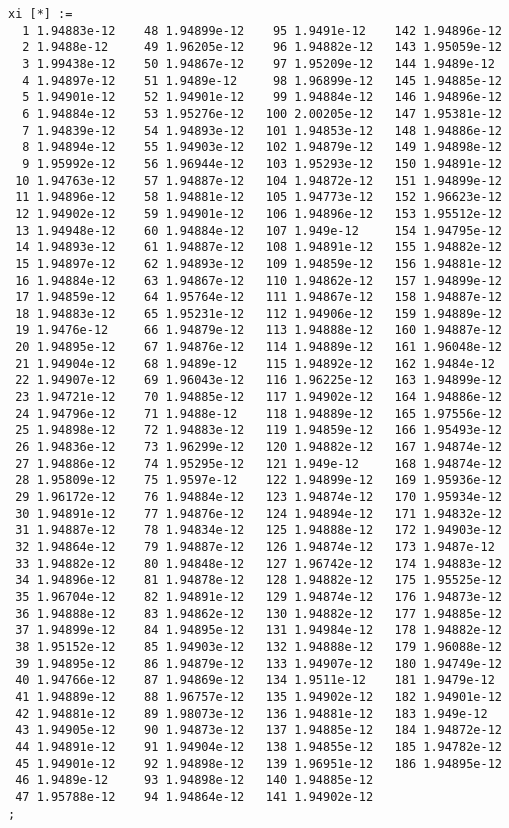 \documentclass{article}
\begin{document}
\begin{verbatim}
xi [*] :=
  1 1.94883e-12    48 1.94899e-12    95 1.9491e-12    142 1.94896e-12
  2 1.9488e-12     49 1.96205e-12    96 1.94882e-12   143 1.95059e-12
  3 1.99438e-12    50 1.94867e-12    97 1.95209e-12   144 1.9489e-12
  4 1.94897e-12    51 1.9489e-12     98 1.96899e-12   145 1.94885e-12
  5 1.94901e-12    52 1.94901e-12    99 1.94884e-12   146 1.94896e-12
  6 1.94884e-12    53 1.95276e-12   100 2.00205e-12   147 1.95381e-12
  7 1.94839e-12    54 1.94893e-12   101 1.94853e-12   148 1.94886e-12
  8 1.94894e-12    55 1.94903e-12   102 1.94879e-12   149 1.94898e-12
  9 1.95992e-12    56 1.96944e-12   103 1.95293e-12   150 1.94891e-12
 10 1.94763e-12    57 1.94887e-12   104 1.94872e-12   151 1.94899e-12
 11 1.94896e-12    58 1.94881e-12   105 1.94773e-12   152 1.96623e-12
 12 1.94902e-12    59 1.94901e-12   106 1.94896e-12   153 1.95512e-12
 13 1.94948e-12    60 1.94884e-12   107 1.949e-12     154 1.94795e-12
 14 1.94893e-12    61 1.94887e-12   108 1.94891e-12   155 1.94882e-12
 15 1.94897e-12    62 1.94893e-12   109 1.94859e-12   156 1.94881e-12
 16 1.94884e-12    63 1.94867e-12   110 1.94862e-12   157 1.94899e-12
 17 1.94859e-12    64 1.95764e-12   111 1.94867e-12   158 1.94887e-12
 18 1.94883e-12    65 1.95231e-12   112 1.94906e-12   159 1.94889e-12
 19 1.9476e-12     66 1.94879e-12   113 1.94888e-12   160 1.94887e-12
 20 1.94895e-12    67 1.94876e-12   114 1.94889e-12   161 1.96048e-12
 21 1.94904e-12    68 1.9489e-12    115 1.94892e-12   162 1.9484e-12
 22 1.94907e-12    69 1.96043e-12   116 1.96225e-12   163 1.94899e-12
 23 1.94721e-12    70 1.94885e-12   117 1.94902e-12   164 1.94886e-12
 24 1.94796e-12    71 1.9488e-12    118 1.94889e-12   165 1.97556e-12
 25 1.94898e-12    72 1.94883e-12   119 1.94859e-12   166 1.95493e-12
 26 1.94836e-12    73 1.96299e-12   120 1.94882e-12   167 1.94874e-12
 27 1.94886e-12    74 1.95295e-12   121 1.949e-12     168 1.94874e-12
 28 1.95809e-12    75 1.9597e-12    122 1.94899e-12   169 1.95936e-12
 29 1.96172e-12    76 1.94884e-12   123 1.94874e-12   170 1.95934e-12
 30 1.94891e-12    77 1.94876e-12   124 1.94894e-12   171 1.94832e-12
 31 1.94887e-12    78 1.94834e-12   125 1.94888e-12   172 1.94903e-12
 32 1.94864e-12    79 1.94887e-12   126 1.94874e-12   173 1.9487e-12
 33 1.94882e-12    80 1.94848e-12   127 1.96742e-12   174 1.94883e-12
 34 1.94896e-12    81 1.94878e-12   128 1.94882e-12   175 1.95525e-12
 35 1.96704e-12    82 1.94891e-12   129 1.94874e-12   176 1.94873e-12
 36 1.94888e-12    83 1.94862e-12   130 1.94882e-12   177 1.94885e-12
 37 1.94899e-12    84 1.94895e-12   131 1.94984e-12   178 1.94882e-12
 38 1.95152e-12    85 1.94903e-12   132 1.94888e-12   179 1.96088e-12
 39 1.94895e-12    86 1.94879e-12   133 1.94907e-12   180 1.94749e-12
 40 1.94766e-12    87 1.94869e-12   134 1.9511e-12    181 1.9479e-12
 41 1.94889e-12    88 1.96757e-12   135 1.94902e-12   182 1.94901e-12
 42 1.94881e-12    89 1.98073e-12   136 1.94881e-12   183 1.949e-12
 43 1.94905e-12    90 1.94873e-12   137 1.94885e-12   184 1.94872e-12
 44 1.94891e-12    91 1.94904e-12   138 1.94855e-12   185 1.94782e-12
 45 1.94901e-12    92 1.94898e-12   139 1.96951e-12   186 1.94895e-12
 46 1.9489e-12     93 1.94898e-12   140 1.94885e-12
 47 1.95788e-12    94 1.94864e-12   141 1.94902e-12
;


\end{verbatim}
\end{document}
